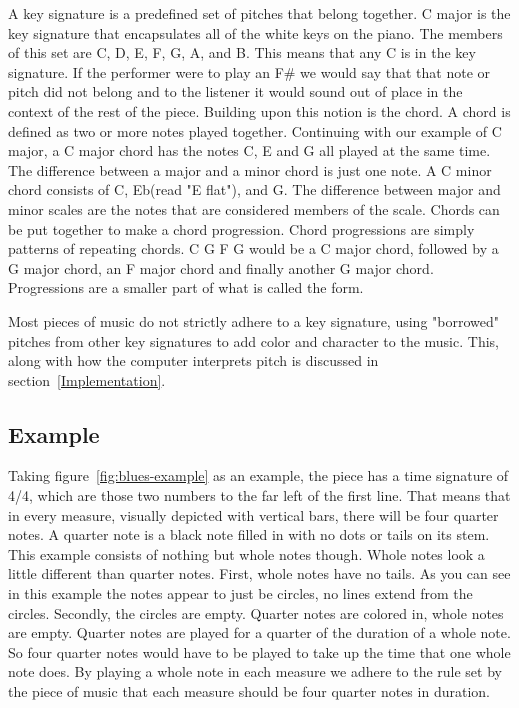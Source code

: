 \documentclass[12pt]{ucthesis}
\begin{document}
A key signature is a predefined set of pitches that belong together. C major is the key signature that encapsulates all of the white keys on the piano. The members of this set are C, D, E, F, G, A, and B. This means that any C is in the key signature. If the performer were to play an F\# we would say that that note or pitch did not belong and to the listener it would sound out of place in the context of the rest of the piece. Building upon this notion is the chord. A chord is defined as two or more notes played together. Continuing with our example of C major, a C major chord has the notes C, E and G all played at the same time. The difference between a major and a minor chord is just one note. A C minor chord consists of C, Eb(read "E flat"), and G. The difference between major and minor scales are the notes that are considered members of the scale. Chords can be put together to make a chord progression. Chord progressions are simply patterns of repeating chords. C G F G would be a C major chord, followed by a G major chord, an F major chord and finally another G major chord. Progressions are a smaller part of what is called the form. 

Most pieces of music do not strictly adhere to a key signature, using "borrowed" pitches from other key signatures to add color and character to the music. This, along with how the computer interprets pitch is discussed in section~\ref{Implementation}.

\subsection{Example}

Taking figure~\ref{fig:blues-example} as an example, the piece has a time signature of 4/4, which are those two numbers to the far left of the first line. That means that in every measure, visually depicted with vertical bars, there will be four quarter notes. A quarter note is a black note filled in with no dots or tails on its stem. This example consists of nothing but whole notes though. Whole notes look a little different than quarter notes. First, whole notes have no tails. As you can see in this example the notes appear to just be circles, no lines extend from the circles. Secondly, the circles are empty. Quarter notes are colored in, whole notes are empty. Quarter notes are played for a quarter of the duration of a whole note. So four quarter notes would have to be played to take up the time that one whole note does. By playing a whole note in each measure we adhere to the rule set by the piece of music that each measure should be four quarter notes in duration.
\end{document}
